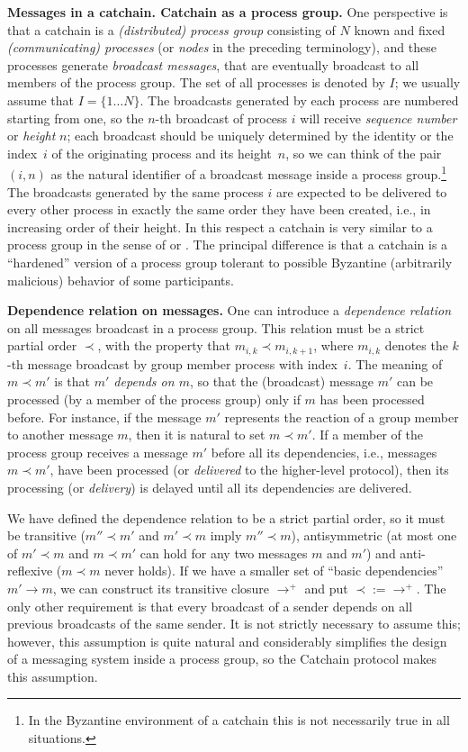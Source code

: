 \documentclass[12pt,oneside]{article}
\def\makepoint#1{\medbreak\noindent{\bf #1.\ }}
\def\nxpoint{\refstepcounter{subsection}%
  \smallbreak\makepoint{\thesubsection}}
\def\nxsubpoint{\refstepcounter{subsubsection}%
  \smallbreak\makepoint{\thesubsubsection}}
\def\emb#1{\textbf{#1.}}
\begin{document}
\nxpoint\emb{Messages in a catchain. Catchain as a process group}
One perspective is that a catchain is a {\em (distributed) process group\/} consisting of $N$ known and fixed {\em (communicating) processes\/} (or {\em nodes\/} in the preceding terminology), and these processes generate {\em broadcast messages}, that are eventually broadcast to all members of the process group. The set of all processes is denoted by $I$; we usually assume that $I=\{1\ldots N\}$. The broadcasts generated by each process are numbered starting from one, so the $n$-th broadcast of process $i$ will receive {\em sequence number\/} or {\em height\/} $n$; each broadcast should be uniquely determined by the identity or the index~$i$ of the originating process and its height~$n$, so we can think of the pair $(i,n)$ as the natural identifier of a broadcast message inside a process group.\footnote{In the Byzantine environment of a catchain this is not necessarily true in all situations.} The broadcasts generated by the same process $i$ are expected to be delivered to every other process in exactly the same order they have been created, i.e., in increasing order of their height. In this respect a catchain is very similar to a process group in the sense of \cite{Birman} or \cite{DistrSys}. The principal difference is that a catchain is a ``hardened'' version of a process group tolerant to possible Byzantine (arbitrarily malicious) behavior of some participants.

\nxsubpoint\emb{Dependence relation on messages}
One can introduce a {\em dependence relation\/} on all messages broadcast in a process group. This relation must be a strict partial order $\prec$, with the property that $m_{i,k}\prec m_{i,k+1}$, where $m_{i,k}$ denotes the $k$-th message broadcast by group member process with index~$i$. The meaning of $m\prec m'$ is that {\em $m'$ depends on $m$}, so that the (broadcast) message $m'$ can be processed (by a member of the process group) only if $m$ has been processed before. For instance, if the message $m'$ represents the reaction of a group member to another message $m$, then it is natural to set $m\prec m'$. If a member of the process group receives a message $m'$ before all its dependencies, i.e., messages $m\prec m'$, have been processed (or {\em delivered\/} to the higher-level protocol), then its processing (or {\em delivery\/}) is delayed until all its dependencies are delivered.

We have defined the dependence relation to be a strict partial order, so it must be transitive ($m''\prec m'$ and $m'\prec m$ imply $m''\prec m$), antisymmetric (at most one of $m'\prec m$ and $m\prec m'$ can hold for any two messages $m$ and $m'$) and anti-reflexive ($m\prec m$ never holds). If we have a smaller set of ``basic dependencies'' $m'\to m$, we can construct its transitive closure $\to^+$ and put $\prec:=\to^+$. The only other requirement is that every broadcast of a sender depends on all previous broadcasts of the same sender. It is not strictly necessary to assume this; however, this assumption is quite natural and considerably simplifies the design of a messaging system inside a process group, so the Catchain protocol makes this assumption.
\end{document}
